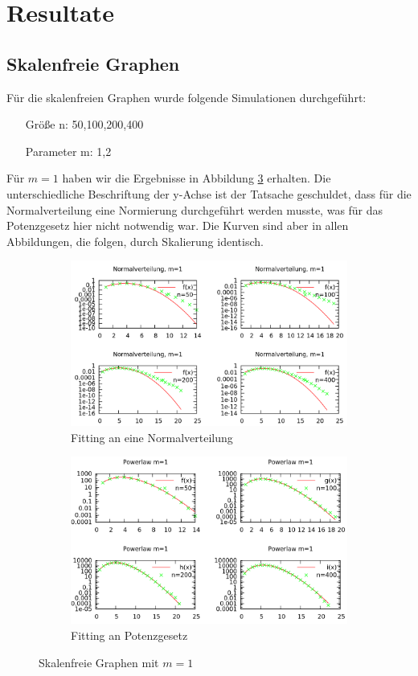 \documentclass[10pt]{article}
\begin{document}
\section{Resultate}
\subsection{Skalenfreie Graphen}
Für die skalenfreien Graphen wurde folgende Simulationen durchgeführt: 
\begin{itemize}
\item[\quad Größe n:] 50,100,200,400
\item[\quad Parameter m:] 1,2
\end{itemize}
Für $m=1$ haben wir die Ergebnisse in Abbildung \ref{fig:m1} erhalten. Die unterschiedliche Beschriftung der y-Achse ist der Tatsache geschuldet, dass für die Normalverteilung eine Normierung durchgeführt werden musste, was für das Potenzgesetz hier nicht notwendig war. Die Kurven sind aber in allen Abbildungen, die folgen, durch Skalierung identisch.

\begin{figure}[h!]
\begin{subfigure}{.5\textwidth}
  \centering
  \includegraphics[width=1\linewidth]{../Results/Normal_M1_logscale.png}
  \caption{Fitting an eine Normalverteilung}
  \label{fig:sfig1}
\end{subfigure}%
\begin{subfigure}{.5\textwidth}
  \centering
  \includegraphics[width=1\linewidth]{../Results/Power_M1_logscale.png}
  \caption{Fitting an Potenzgesetz}
  \label{fig:sfig2}
\end{subfigure}
\caption{Skalenfreie Graphen mit $m=1$}
\label{fig:m1}
\end{figure}
\end{document}
